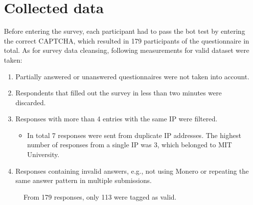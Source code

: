 \documentclass[
  printed, %
  table,   %
  lof,     %
  lot,     %
           oneside, color
]{fithesis3}
\begin{document}
\section{Collected data}
Before entering the survey, each participant had to pass the bot test by entering the correct CAPTCHA, which resulted in 179 participants of the questionnaire in total. As for survey data cleansing, following measurements for valid dataset were taken:
\begin{enumerate}
\itemsep0em
\item Partially answered or unanswered questionnaires were not taken into account. 
\item Respondents that filled out the survey in less than two minutes were discarded.
\item Responses with more than 4 entries with the same IP were filtered.
\begin{itemize}
\item In total 7 responses were sent from duplicate IP addresses. The highest number of responses from a single IP was 3, which belonged to MIT University.
\end{itemize}
\item Responses containing invalid answers, e.g., not using Monero or repeating the same answer pattern in multiple submissions.
\vspace{-1.3em}
\end{enumerate}
\begin{center}
\begin{figure}[H]
\caption{From 179 responses, only 113 were tagged as valid.}
\label{chart:price}\end{figure}\end{center}
\end{document}

